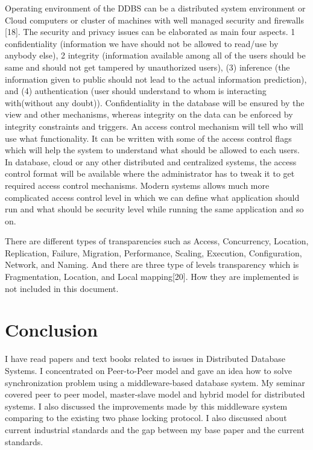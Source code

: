 \documentclass{article}[12pt,a4paper]
\begin{document}
Operating environment of the DDBS can be a distributed system environment or Cloud computers or cluster of machines with well managed security and firewalls [18]. The security and privacy issues can be elaborated as main four aspects. {1} confidentiality (information we have should not be allowed to read/use by anybody else), {2} integrity (information available among all of the users should be same and should not get tampered by unauthorized users), (3) inference (the information given to public should not lead to the actual information prediction), and (4) authentication (user should understand to whom is interacting with(without any doubt)). Confidentiality in the database will be ensured by the view and other mechanisms, whereas integrity on the data can be enforced by integrity constraints and triggers. 
An access control mechanism will tell who will use what functionality. It can be written with some of the access control flags which will help the system to understand what should be allowed to each users. In database, cloud or any other distributed and centralized systems, the access control format will be available where the administrator has to tweak it to get required access control mechanisms. Modern systems allows much more complicated access control level in which we can define what application should run and what should be security level while running the same application and so on.

There are different types of transparencies such as Access, Concurrency, Location, Replication, Failure, Migration, Performance, Scaling, Execution, Configuration, Network, and Naming. And there are three type of levels transparency which is Fragmentation, Location, and Local mapping[20]. How they are implemented is not included in this document.


\newpage
\section{Conclusion}
I have read papers and text books related to issues in Distributed Database Systems. I concentrated on Peer-to-Peer model and gave an idea how to solve synchronization problem using a middleware-based database system. My seminar covered peer to peer model, master-slave model and hybrid model for distributed systems. I also discussed the improvements made by this middleware system comparing to the existing two phase locking protocol. I also discussed about current industrial standards and the gap between my base paper and the current standards.
\end{document}
